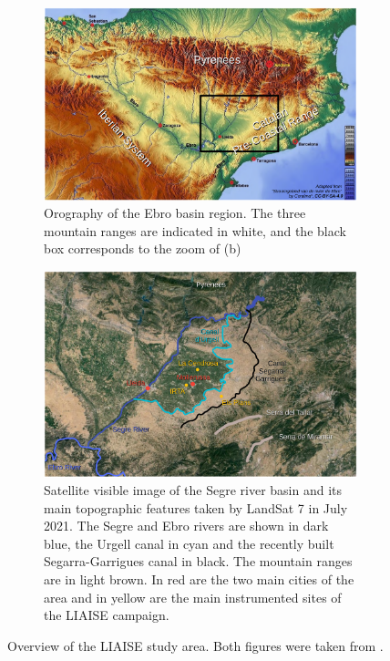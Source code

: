 \begin{figure}[hbtp]
    \centering
    \begin{subfigure}{\textwidth}
        \centering
        \includegraphics[width=0.8\linewidth]{images/chap5/liaise_area_ebro_lunel.png}
        \caption{Orography of the Ebro basin region. The three mountain ranges are indicated in white, and the black box corresponds to the zoom of (b)}
    \end{subfigure}
    \begin{subfigure}{\textwidth}
        \centering
        \includegraphics[width=0.7\linewidth]{images/chap5/liaise_area_zoom_lunel.png}
        \caption{Satellite visible image of the Segre river basin and its main topographic features taken by LandSat 7 in July 2021. The Segre and Ebro rivers are shown in dark blue, the Urgell canal in cyan and the recently built Segarra-Garrigues canal in black. The mountain ranges are in light brown. In red are the two main cities of the area and in yellow are the main instrumented sites of the LIAISE campaign.}
    \end{subfigure}
    \caption{Overview of the LIAISE study area. Both figures were taken from \citet{lunel_interactions_2024}.}
    \label{fig:liaise_area_both}
\end{figure}

